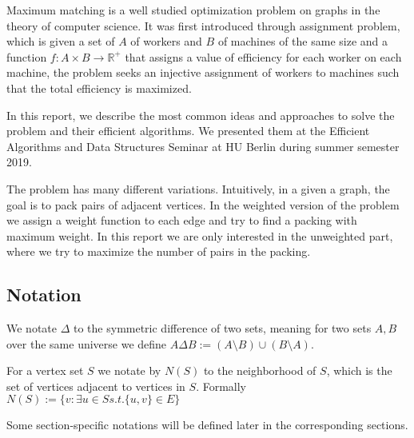 Maximum matching is a well studied optimization problem on graphs in the theory of computer science. It was first introduced through assignment problem, which is given a set of $A$ of workers and $B$ of machines of the same size and a function $f:A\times B \rightarrow \mathbb{R}^{+}$ that assigns a value of efficiency for each worker on each machine, the problem seeks an injective assignment of workers to machines such that the total efficiency is maximized.

In this report, we describe the most common ideas and approaches to solve the problem and their efficient algorithms. We presented them at the Efficient Algorithms and Data Structures Seminar at HU Berlin during summer semester 2019.

The problem has many different variations. Intuitively, in a given a graph, the goal is to pack pairs of adjacent vertices. In the weighted version of the problem we assign a weight function to each edge and try to find a packing with maximum weight. In this report we are only interested in the unweighted part, where we try to maximize the number of pairs in the packing.

\subsection{Notation}
We notate $\Delta$  to the symmetric difference of two sets, meaning for two sets $A, B$ over the same universe we define $A\Delta B := \left( A \setminus B \right) \cup \left( B \setminus A \right)$.

For a vertex set $S$ we notate by $N(S)$ to the neighborhood of $S$, which is the set of vertices adjacent to vertices in $S$. Formally $N(S) := \{v: \exists u \in S s.t. \{u, v\} \in E\}$

Some section-specific notations will be defined later in the corresponding sections.
